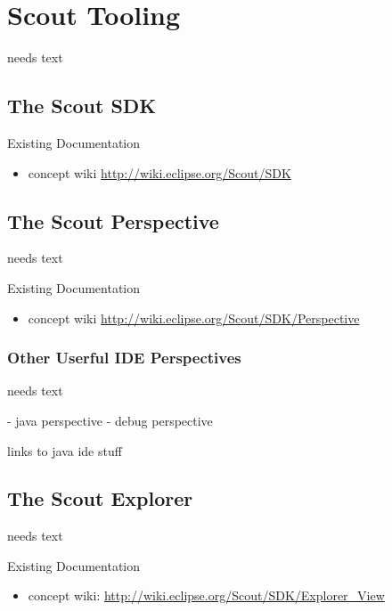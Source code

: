 \documentclass[a4paper,10pt,twoside]{book}
\begin{document}
  \sloppy
\fi

\chapter{Scout Tooling}

needs text

\section{The Scout SDK}

\noindent Existing Documentation
\begin{itemize}
  \item concept wiki \url{http://wiki.eclipse.org/Scout/SDK}
\end{itemize}

\section{The Scout Perspective}
needs text

\noindent Existing Documentation
\begin{itemize}
  \item concept wiki \url{http://wiki.eclipse.org/Scout/SDK/Perspective}
\end{itemize}

\subsection{Other Userful IDE Perspectives}
needs text

- java perspective
- debug perspective

links to java ide stuff

\section{The Scout Explorer}
needs text

\noindent Existing Documentation
\begin{itemize}
  \item concept wiki: \url{http://wiki.eclipse.org/Scout/SDK/Explorer_View}
\end{itemize}
\end{document}
